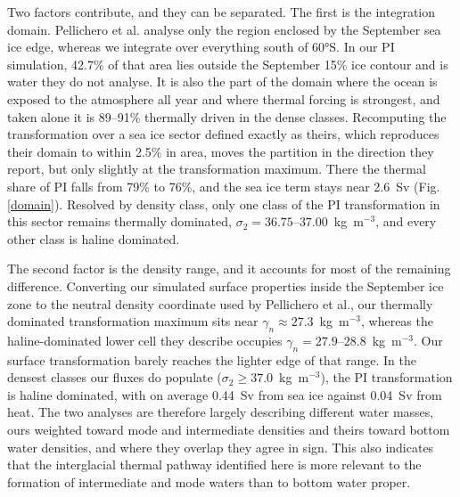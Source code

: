 \documentclass[pdflatex,sn-nature]{sn-jnl}
\begin{document}
Two factors contribute, and they can be separated. The first is the integration domain. Pellichero et al. analyse only the region enclosed by the September sea ice edge, whereas we integrate over everything south of 60°S. In our PI simulation, 42.7\% of that area lies outside the September 15\% ice contour and is water they do not analyse. It is also the part of the domain where the ocean is exposed to the atmosphere all year and where thermal forcing is strongest, and taken alone it is 89--91\% thermally driven in the dense classes. Recomputing the transformation over a sea ice sector defined exactly as theirs, which reproduces their domain to within 2.5\% in area, moves the partition in the direction they report, but only slightly at the transformation maximum. There the thermal share of PI falls from 79\% to 76\%, and the sea ice term stays near 2.6~Sv (Fig. \ref{domain}).
 Resolved by density class, only one class of the PI transformation in this sector remains thermally dominated, $\sigma_2 = 36.75$--$37.00$~kg~m$^{-3}$, and every other class is haline dominated.

The second factor is the density range, and it accounts for most of the remaining difference. Converting our simulated surface properties inside the September ice zone to the neutral density coordinate used by Pellichero et al., our thermally dominated transformation maximum sits near $\gamma_n \approx 27.3$~kg~m$^{-3}$, whereas the haline-dominated lower cell they describe occupies $\gamma_n = 27.9$--$28.8$~kg~m$^{-3}$. Our surface transformation barely reaches the lighter edge of that range. In the densest classes our fluxes do populate ($\sigma_2 \ge 37.0$~kg~m$^{-3}$), the PI transformation is haline dominated, with on average 0.44~Sv from sea ice against 0.04~Sv from heat. The two analyses are therefore largely describing different water masses, ours weighted toward mode and intermediate densities and theirs toward bottom water densities, and where they overlap they agree in sign. This also indicates that the interglacial thermal pathway identified here is more relevant to the formation of intermediate and mode waters than to bottom water proper.
\end{document}
